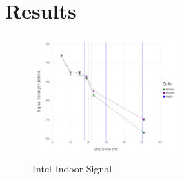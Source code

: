 \section{Results}
\begin{figure}[!h]
\centering
\includegraphics[width=0.5\textwidth]{figures/Intel_Inside_Beamformed}
\caption{Intel Indoor Signal}
\end{figure}
